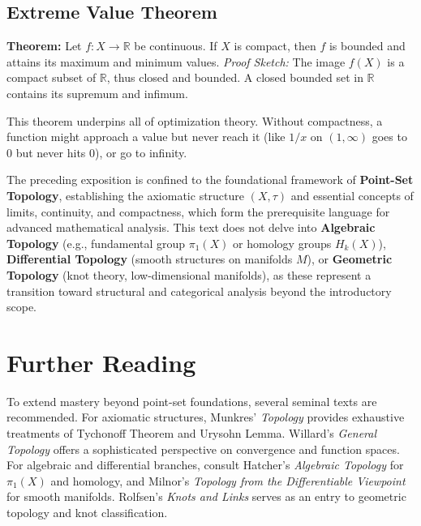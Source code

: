 \subsection{Extreme Value Theorem}
\textbf{Theorem:} Let $f: X \to \mathbb{R}$ be continuous. If $X$ is compact, then $f$ is bounded and attains its maximum and minimum values.
\textit{Proof Sketch:} The image $f(X)$ is a compact subset of $\mathbb{R}$, thus closed and bounded. A closed bounded set in $\mathbb{R}$ contains its supremum and infimum.

This theorem underpins all of optimization theory. Without compactness, a function might approach a value but never reach it (like $1/x$ on $(1, \infty)$ goes to 0 but never hits 0), or go to infinity.

The preceding exposition is confined to the foundational framework of \textbf{Point-Set Topology}, establishing the axiomatic structure $(X,\tau)$ and essential concepts of limits, continuity, and compactness, which form the prerequisite language for advanced mathematical analysis. This text does not delve into \textbf{Algebraic Topology} (e.g., fundamental group $\pi_1(X)$ or homology groups $H_k(X)$), \textbf{Differential Topology} (smooth structures on manifolds $M$), or \textbf{Geometric Topology} (knot theory, low-dimensional manifolds), as these represent a transition toward structural and categorical analysis beyond the introductory scope.

\section*{Further Reading}
To extend mastery beyond point-set foundations, several seminal texts are recommended. For axiomatic structures, Munkres' \textit{Topology} provides exhaustive treatments of Tychonoff Theorem and Urysohn Lemma. Willard's \textit{General Topology} offers a sophisticated perspective on convergence and function spaces. For algebraic and differential branches, consult Hatcher's \textit{Algebraic Topology} for $\pi_1(X)$ and homology, and Milnor's \textit{Topology from the Differentiable Viewpoint} for smooth manifolds. Rolfsen's \textit{Knots and Links} serves as an entry to geometric topology and knot classification.
